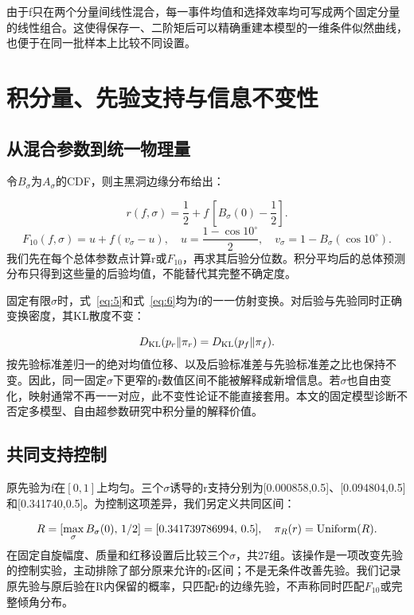 \documentclass[UTF8,a4paper,11pt,fontset=fandol]{ctexart}
\begin{document}
由于f只在两个分量间线性混合，每一事件均值和选择效率均可写成两个固定分量的线性组合。这使得保存一、二阶矩后可以精确重建本模型的一维条件似然曲线，也便于在同一批样本上比较不同设置。

\FloatBarrier
\section{积分量、先验支持与信息不变性}\label{sec:4}
\subsection{从混合参数到统一物理量}\label{sec:4.1}
令\(B_\sigma\)为\(A_\sigma\)的CDF，则主黑洞边缘分布给出：

\begin{equation}\label{eq:5}
r(f,\sigma)=\frac{1}{2}+f\,[B_\sigma(0)-\frac{1}{2}].
\end{equation}
\begin{equation}\label{eq:6}
F_{10}(f,\sigma)=u+f(v_\sigma-u),\quad u=\frac{1-\cos10^\circ}{2},\quad v_\sigma=1-B_\sigma(\cos10^\circ).
\end{equation}
我们先在每个总体参数点计算r或\(F_{10}\)，再求其后验分位数。积分平均后的总体预测分布只得到这些量的后验均值，不能替代其完整不确定度。

固定有限\(\sigma\)时，式~\eqref{eq:5}和式~\eqref{eq:6}均为f的一一仿射变换。对后验与先验同时正确变换密度，其KL散度不变：

\begin{equation}\label{eq:7}
D_{\rm KL}(p_r\Vert\pi_r)=D_{\rm KL}(p_f\Vert\pi_f).
\end{equation}
按先验标准差归一的绝对均值位移、以及后验标准差与先验标准差之比也保持不变。因此，同一固定\(\sigma\)下更窄的r数值区间不能被解释成新增信息。若\(\sigma\)也自由变化，映射通常不再一一对应，此不变性论证不能直接套用。本文的固定模型诊断不否定多模型、自由超参数研究中积分量的解释价值\cite{ref5}。

\subsection{共同支持控制}\label{sec:4.2}
原先验为f在\([0,1]\)上均匀。三个\(\sigma\)诱导的r支持分别为[0.000858,0.5]、[0.094804,0.5]和[0.341740,0.5]。为控制这项差异，我们另定义共同区间：

\begin{equation}\label{eq:8}
R=[\max_\sigma B_\sigma(0),\,1/2]=[0.341739786994,\,0.5],\quad \pi_R(r)={\rm Uniform}(R).
\end{equation}
在固定自旋幅度、质量和红移设置后比较三个\(\sigma\)，共27组。该操作是一项改变先验的控制实验，主动排除了部分原来允许的r区间；不是无条件改善先验。我们记录原先验与原后验在R内保留的概率，只匹配r的边缘先验，不声称同时匹配\(F_{10}\)或完整倾角分布。
\end{document}
